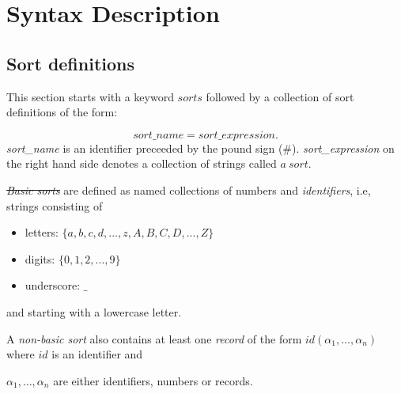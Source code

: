 \documentclass[12pt, letterpaper]{article}
\begin{document}
\section{Syntax Description}\label{syntax}


\subsection{Sort definitions}\label{ss}


This section starts with a keyword $sorts$ followed by a collection of sort definitions of the form: 

\begin{equation*}
  sort\_name=sort\_expression.
\end{equation*}
\textit{sort\_name} is an identifier preceeded by the pound sign (\#).
\textit{sort\_expression}  on the right hand side denotes a collection of strings called $a~sort$.



\st \textit{Basic sorts} are defined as named collections of numbers and \textit{identifiers}, i.e, strings consisting of

\begin{itemize}

 \item letters: $\{a,b,c,d,...,z,A,B,C,D,...,Z\}$

 \item digits: $\{0,1,2,...,9\}$

 \item underscore: $\_$

\end{itemize}

and starting with a lowercase letter.


\medskip\noindent
A \textit{non-basic sort} also contains at least one \textit{record} of the form $id(\alpha_1,\dots, \alpha_n)$ where $id$ is an identifier and 

$\alpha_1, \dots, \alpha_n$ are either identifiers, numbers or records. 
\end{document}
